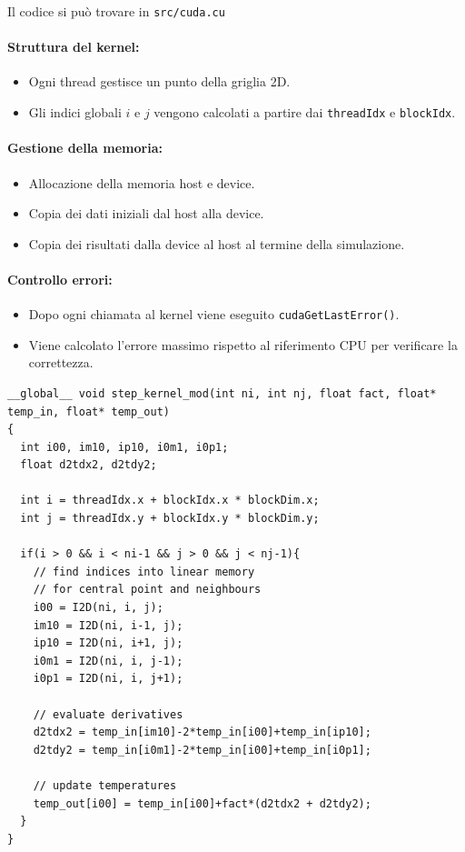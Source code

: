 \noindent
Il codice si può trovare in \texttt{src/cuda.cu}

\paragraph{Struttura del kernel:}
\begin{itemize}
    \item Ogni thread gestisce un punto della griglia 2D.
    \item Gli indici globali $i$ e $j$ vengono calcolati a partire dai \texttt{threadIdx} e \texttt{blockIdx}.
\end{itemize}

\paragraph{Gestione della memoria:}
\begin{itemize}
    \item Allocazione della memoria host e device.
    \item Copia dei dati iniziali dal host alla device.
    \item Copia dei risultati dalla device al host al termine della simulazione.
\end{itemize}

\paragraph{Controllo errori:}
\begin{itemize}
    \item Dopo ogni chiamata al kernel viene eseguito \texttt{cudaGetLastError()}.
    \item Viene calcolato l'errore massimo rispetto al riferimento CPU per verificare la correttezza.
\end{itemize}

\begin{lstlisting}
__global__ void step_kernel_mod(int ni, int nj, float fact, float* temp_in, float* temp_out)
{
  int i00, im10, ip10, i0m1, i0p1;
  float d2tdx2, d2tdy2;

  int i = threadIdx.x + blockIdx.x * blockDim.x;
  int j = threadIdx.y + blockIdx.y * blockDim.y;

  if(i > 0 && i < ni-1 && j > 0 && j < nj-1){
    // find indices into linear memory
    // for central point and neighbours
    i00 = I2D(ni, i, j);
    im10 = I2D(ni, i-1, j);
    ip10 = I2D(ni, i+1, j);
    i0m1 = I2D(ni, i, j-1);
    i0p1 = I2D(ni, i, j+1);

    // evaluate derivatives
    d2tdx2 = temp_in[im10]-2*temp_in[i00]+temp_in[ip10];
    d2tdy2 = temp_in[i0m1]-2*temp_in[i00]+temp_in[i0p1];

    // update temperatures
    temp_out[i00] = temp_in[i00]+fact*(d2tdx2 + d2tdy2);
  }
}
\end{lstlisting}



